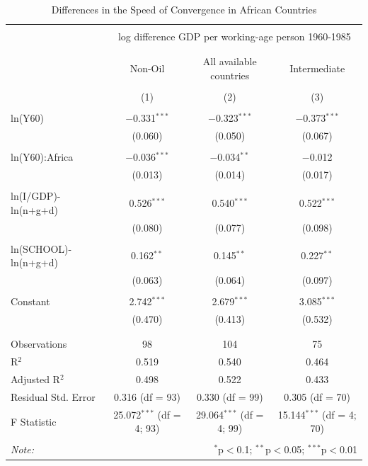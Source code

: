 \documentclass[a4paper,11pt]{article}
\begin{document}
\begin{table}[!htbp] \centering 
  \caption{Differences in the Speed of Convergence in African Countries} 
  \label{tab:SpeedOfConvergence} 
\begin{tabular}{@{\extracolsep{5pt}}lccc} 
\\[-1.8ex]\hline 
\hline \\[-1.8ex] 
 & \multicolumn{3}{c}{log difference GDP per working-age person 1960-1985} \\ 
\cline{2-4} 
\\[-1.8ex] & \multicolumn{3}{c}{} \\ 
 & Non-Oil & All available countries & Intermediate \\ 
\\[-1.8ex] & (1) & (2) & (3)\\ 
\hline \\[-1.8ex] 
 ln(Y60) & $-$0.331$^{***}$ & $-$0.323$^{***}$ & $-$0.373$^{***}$ \\ 
  & (0.060) & (0.050) & (0.067) \\ 
  & & & \\
  ln(Y60):Africa & $-$0.036$^{***}$ & $-$0.034$^{**}$ & $-$0.012 \\ 
  & (0.013) & (0.014) & (0.017) \\ 
  & & & \\  
 ln(I/GDP)-ln(n+g+d) & 0.526$^{***}$ & 0.540$^{***}$ & 0.522$^{***}$ \\ 
  & (0.080) & (0.077) & (0.098) \\ 
  & & & \\ 
 ln(SCHOOL)-ln(n+g+d) & 0.162$^{**}$ & 0.145$^{**}$ & 0.227$^{**}$ \\ 
  & (0.063) & (0.064) & (0.097) \\ 
  & & & \\ 

 Constant & 2.742$^{***}$ & 2.679$^{***}$ & 3.085$^{***}$ \\ 
  & (0.470) & (0.413) & (0.532) \\ 
  & & & \\ 
\hline \\[-1.8ex] 
Observations & 98 & 104 & 75 \\ 
R$^{2}$ & 0.519 & 0.540 & 0.464 \\ 
Adjusted R$^{2}$ & 0.498 & 0.522 & 0.433 \\ 
Residual Std. Error & 0.316 (df = 93) & 0.330 (df = 99) & 0.305 (df = 70) \\ 
F Statistic & 25.072$^{***}$ (df = 4; 93) & 29.064$^{***}$ (df = 4; 99) & 15.144$^{***}$ (df = 4; 70) \\ 
\hline 
\hline \\[-1.8ex] 
\textit{Note:}  & \multicolumn{3}{r}{$^{*}$p$<$0.1; $^{**}$p$<$0.05; $^{***}$p$<$0.01} \\ 
\end{tabular} 
\end{table} 
\end{document}
